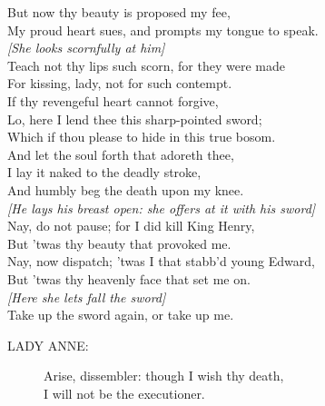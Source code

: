 \documentclass{article}
\begin{document}
\begin{description}
\hspace{1pt}But now thy beauty is proposed my fee,\\
\hspace{1pt}My proud heart sues, and prompts my tongue to speak.\\
{\it [She looks scornfully at him]}\\
\hspace{1pt}Teach not thy lips such scorn, for they were made\\
\hspace{1pt}For kissing, lady, not for such contempt.\\
\hspace{1pt}If thy revengeful heart cannot forgive,\\
\hspace{1pt}Lo, here I lend thee this sharp-pointed sword;\\
\hspace{1pt}Which if thou please to hide in this true bosom.\\
\hspace{1pt}And let the soul forth that adoreth thee,\\
\hspace{1pt}I lay it naked to the deadly stroke,\\
\hspace{1pt}And humbly beg the death upon my knee.\\
{\it [He lays his breast open: she offers at it with his sword]}\\
\hspace{1pt}Nay, do not pause; for I did kill King Henry,\\
\hspace{1pt}But 'twas thy beauty that provoked me.\\
\hspace{1pt}Nay, now dispatch; 'twas I that stabb'd young Edward,\\
\hspace{1pt}But 'twas thy heavenly face that set me on.\\
{\it [Here she lets fall the sword]}\\
\hspace{1pt}Take up the sword again, or take up me.\\
\end{description}
\begin{description}
\item[LADY ANNE:] 
\hspace{1pt}Arise, dissembler: though I wish thy death,\\
\hspace{1pt}I will not be the executioner.\\
\end{description}
\end{document}
